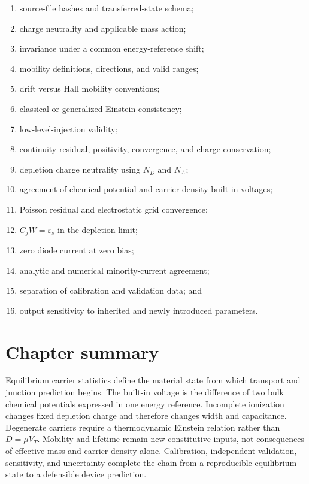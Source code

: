 \begin{enumerate}
 \item source-file hashes and transferred-state schema;
 \item charge neutrality and applicable mass action;
 \item invariance under a common energy-reference shift;
 \item mobility definitions, directions, and valid ranges;
 \item drift versus Hall mobility conventions;
 \item classical or generalized Einstein consistency;
 \item low-level-injection validity;
 \item continuity residual, positivity, convergence, and charge conservation;
 \item depletion charge neutrality using $N_D^+$ and $N_A^-$;
 \item agreement of chemical-potential and carrier-density built-in voltages;
 \item Poisson residual and electrostatic grid convergence;
 \item $C_jW=\varepsilon_s$ in the depletion limit;
 \item zero diode current at zero bias;
 \item analytic and numerical minority-current agreement;
 \item separation of calibration and validation data; and
 \item output sensitivity to inherited and newly introduced parameters.
\end{enumerate}

\section{Chapter summary}

Equilibrium carrier statistics define the material state from which transport
and junction prediction begins.  The built-in voltage is the difference of two
bulk chemical potentials expressed in one energy reference.  Incomplete
ionization changes fixed depletion charge and therefore changes width and
capacitance.  Degenerate carriers require a thermodynamic Einstein relation
rather than $D=\mu V_T$.  Mobility and lifetime remain new constitutive inputs,
not consequences of effective mass and carrier density alone.  Calibration,
independent validation, sensitivity, and uncertainty complete the chain from a
reproducible equilibrium state to a defensible device prediction.
